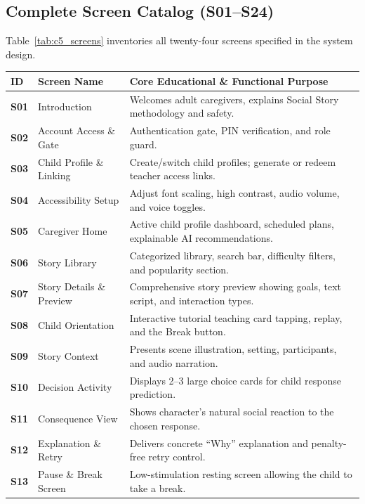 \subsection{Complete Screen Catalog (S01--S24)}

Table~\ref{tab:c5_screens} inventories all twenty-four screens specified in the system design.

\begin{xltabular}{\textwidth}{|p{1.2cm}|p{4.2cm}|X|}
\hline
\textbf{ID} & \textbf{Screen Name} & \textbf{Core Educational \& Functional Purpose} \\ \hline
\endhead
\textbf{S01} & Introduction & Welcomes adult caregivers, explains Social Story methodology and safety. \\ \hline
\textbf{S02} & Account Access \& Gate & Authentication gate, PIN verification, and role guard. \\ \hline
\textbf{S03} & Child Profile \& Linking & Create/switch child profiles; generate or redeem teacher access links. \\ \hline
\textbf{S04} & Accessibility Setup & Adjust font scaling, high contrast, audio volume, and voice toggles. \\ \hline
\textbf{S05} & Caregiver Home & Active child profile dashboard, scheduled plans, explainable AI recommendations. \\ \hline
\textbf{S06} & Story Library & Categorized library, search bar, difficulty filters, and popularity section. \\ \hline
\textbf{S07} & Story Details \& Preview & Comprehensive story preview showing goals, text script, and interaction types. \\ \hline
\textbf{S08} & Child Orientation & Interactive tutorial teaching card tapping, replay, and the Break button. \\ \hline
\textbf{S09} & Story Context & Presents scene illustration, setting, participants, and audio narration. \\ \hline
\textbf{S10} & Decision Activity & Displays 2--3 large choice cards for child response prediction. \\ \hline
\textbf{S11} & Consequence View & Shows character's natural social reaction to the chosen response. \\ \hline
\textbf{S12} & Explanation \& Retry & Delivers concrete ``Why'' explanation and penalty-free retry control. \\ \hline
\textbf{S13} & Pause \& Break Screen & Low-stimulation resting screen allowing the child to take a break. \\ \hline

\end{xltabular}
